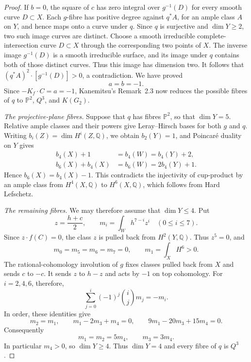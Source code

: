 \begin{proof}
If $b=0$, the square of $c$ has zero integral over $g^{-1}(D)$
for every smooth curve $D\subset X$. Each $g$-fibre has positive
degree against $q^*A$, for an ample class $A$ on $Y$, and hence maps
onto a curve under $q$. Since $q$ is surjective and $\dim Y\ge2$,
two such image curves are distinct. Choose a smooth irreducible
complete-intersection curve $D\subset X$ through the corresponding
two points of $X$. The inverse image $g^{-1}(D)$ is a smooth
irreducible surface, and its image under $q$ contains both of those
distinct curves. Thus this image has dimension two. It follows that
$(q^*A)^2\cdot[g^{-1}(D)]>0$, a contradiction. We have proved
\[
 a=b=-1.
\]
Since $-K_f\cdot C=a=-1$, Kanemitsu's Remark~2.3 now reduces the
possible fibres of $q$ to
$\mathbb P^2$, $Q^3$, and $K(G_2)$.

\smallskip
\noindent\emph{The projective-plane fibres.}
Suppose that $q$ has fibres $\mathbb P^2$, so that $\dim Y=5$.
Relative ample classes and their powers give Leray--Hirsch bases for
both $g$ and $q$. Writing $b_i(Z)=\dim H^i(Z,\mathbb Q)$, we obtain
$b_2(Y)=1$, and Poincar\'e duality
on $Y$ gives
\[
\begin{split}
 b_4(X)+1&=b_4(W)=b_4(Y)+2,\\
 b_6(X)+b_4(X)&=b_6(W)=2b_4(Y)+1.
\end{split}
\]
Hence $b_6(X)=b_4(X)-1$. This contradicts the injectivity of
cup-product by an ample class from $H^4(X,\mathbb Q)$ to
$H^6(X,\mathbb Q)$, which follows from Hard Lefschetz.

\smallskip
\noindent\emph{The remaining fibres.}
We may therefore assume that $\dim Y\le4$. Put
\[
 z=\frac{h+c}{2},\qquad m_i=\int_W h^{7-i}z^i\quad(0\le i\le7).
\]
Since $z\cdot f(C)=0$, the class $z$ is pulled back from
$H^2(Y,\mathbb Q)$. Thus $z^5=0$, and
\[
 m_0=m_5=m_6=m_7=0,\qquad m_1=\int_X H^6>0.
\]
The rational-cohomology involution of $g$ fixes classes pulled back
from $X$ and sends $c$ to $-c$. It sends $z$ to $h-z$ and acts by
$-1$ on top cohomology. For $i=2,4,6$, therefore,
\[
 \sum_{j=0}^i(-1)^j\binom ij m_j=-m_i.
\]
In order, these identities give
\[
 m_2=m_1,\qquad m_1-2m_3+m_4=0,
 \qquad9m_1-20m_3+15m_4=0.
\]
Consequently
\[
 m_1=m_2=5m_4,\qquad m_3=3m_4.
\]
In particular $m_4>0$, so $\dim Y\ge4$. Thus $\dim Y=4$ and
every fibre of $q$ is $Q^3$.


\end{proof}
